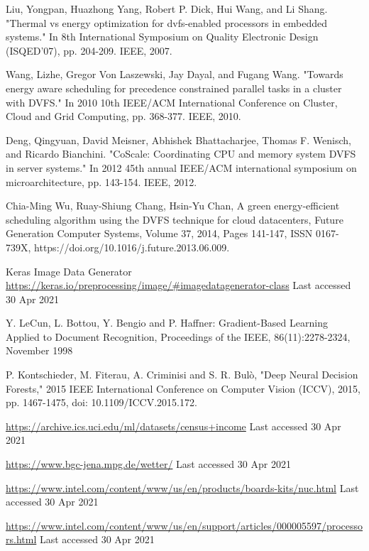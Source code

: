 \documentclass[runningheads]{llncs}
\begin{document}
\begin{thebibliography}{8}
Liu, Yongpan, Huazhong Yang, Robert P. Dick, Hui Wang, and Li Shang. "Thermal vs energy optimization for dvfs-enabled processors in embedded systems." In 8th International Symposium on Quality Electronic Design (ISQED'07), pp. 204-209. IEEE, 2007.


Wang, Lizhe, Gregor Von Laszewski, Jay Dayal, and Fugang Wang. "Towards energy aware scheduling for precedence constrained parallel tasks in a cluster with DVFS." In 2010 10th IEEE/ACM International Conference on Cluster, Cloud and Grid Computing, pp. 368-377. IEEE, 2010.

Deng, Qingyuan, David Meisner, Abhishek Bhattacharjee, Thomas F. Wenisch, and Ricardo Bianchini. "CoScale: Coordinating CPU and memory system DVFS in server systems." In 2012 45th annual IEEE/ACM international symposium on microarchitecture, pp. 143-154. IEEE, 2012.


Chia-Ming Wu, Ruay-Shiung Chang, Hsin-Yu Chan,
A green energy-efficient scheduling algorithm using the DVFS technique for cloud datacenters,
Future Generation Computer Systems,
Volume 37,
2014,
Pages 141-147,
ISSN 0167-739X,
https://doi.org/10.1016/j.future.2013.06.009.




Keras Image Data Generator \url{https://keras.io/preprocessing/image/\#imagedatagenerator-class} Last accessed 30 Apr 2021


Y. LeCun, L. Bottou, Y. Bengio and P. Haffner: Gradient-Based Learning Applied to Document Recognition, Proceedings of the IEEE, 86(11):2278-2324, November 1998

P. Kontschieder, M. Fiterau, A. Criminisi and S. R. Bulò, "Deep Neural Decision Forests," 2015 IEEE International Conference on Computer Vision (ICCV), 2015, pp. 1467-1475, doi: 10.1109/ICCV.2015.172.

\url{https://archive.ics.uci.edu/ml/datasets/census+income} Last accessed 30 Apr 2021

\url{https://www.bgc-jena.mpg.de/wetter/} Last accessed 30 Apr 2021 

\url{https://www.intel.com/content/www/us/en/products/boards-kits/nuc.html} Last accessed 30 Apr 2021 


\url{https://www.intel.com/content/www/us/en/support/articles/000005597/processors.html} Last accessed 30 Apr 2021 



\end{thebibliography}
\end{document}
